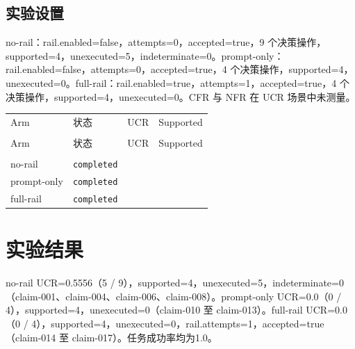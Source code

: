 \documentclass[UTF8]{ctexart}
\begin{document}
\subsection{实验设置}
no-\allowbreak{}rail：rail.enabled=false，attempts=0，accepted=true，9 个决策操作，supported=4，unexecuted=5，indeterminate=0。prompt-\allowbreak{}only：rail.enabled=false，attempts=0，accepted=true，4 个决策操作，supported=4，unexecuted=0。full-\allowbreak{}rail：rail.enabled=true，attempts=1，accepted=true，4 个决策操作，supported=4，unexecuted=0。CFR 与 NFR 在 UCR 场景中未测量。
\begin{longtable}{@{}>{\raggedright\arraybackslash}p{}>{\raggedright\arraybackslash}p{}>{\raggedleft\arraybackslash}p{}>{\raggedleft\arraybackslash}p{}@{}}
\toprule
Arm & 状态 & UCR & Supported\\\\
\midrule
\endfirsthead
\toprule
Arm & 状态 & UCR & Supported\\\\
\midrule
\endhead
no-\allowbreak{}rail & \texttt{\scriptsize completed} & 0.5556 & 4 \\
prompt-\allowbreak{}only & \texttt{\scriptsize completed} & 0.0 & 4 \\
full-\allowbreak{}rail & \texttt{\scriptsize completed} & 0.0 & 4 \\
\bottomrule
\end{longtable}
\section{实验结果}
no-\allowbreak{}rail UCR=0.5556（5 / 9），supported=4，unexecuted=5，indeterminate=0（claim-\allowbreak{}001、claim-\allowbreak{}004、claim-\allowbreak{}006、claim-\allowbreak{}008）。prompt-\allowbreak{}only UCR=0.0（0 / 4），supported=4，unexecuted=0（claim-\allowbreak{}010 至 claim-\allowbreak{}013）。full-\allowbreak{}rail UCR=0.0（0 / 4），supported=4，unexecuted=0，rail.attempts=1，accepted=true（claim-\allowbreak{}014 至 claim-\allowbreak{}017）。任务成功率均为1.0。
\end{document}
